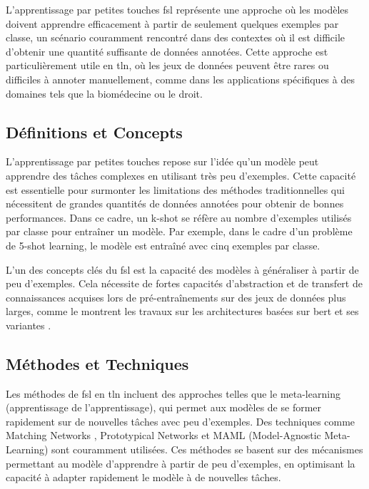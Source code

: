 \documentclass[12pt]{report}
\begin{document}
L'apprentissage par petites touches \gls{fsl} représente une approche où les modèles doivent apprendre efficacement à partir de seulement quelques exemples par classe, un scénario couramment rencontré dans des contextes où il est difficile d'obtenir une quantité suffisante de données annotées. Cette approche est particulièrement utile en \gls{tln}, où les jeux de données peuvent être rares ou difficiles à annoter manuellement, comme dans les applications spécifiques à des domaines tels que la biomédecine ou le droit.

\subsection{Définitions et Concepts}

L'apprentissage par petites touches repose sur l'idée qu'un modèle peut apprendre des tâches complexes en utilisant très peu d'exemples. Cette capacité est essentielle pour surmonter les limitations des méthodes traditionnelles qui nécessitent de grandes quantités de données annotées pour obtenir de bonnes performances. Dans ce cadre, un k-shot se réfère au nombre d'exemples utilisés par classe pour entraîner un modèle. Par exemple, dans le cadre d'un problème de 5-shot learning, le modèle est entraîné avec cinq exemples par classe.

L'un des concepts clés du \gls{fsl} est la capacité des modèles à généraliser à partir de peu d'exemples. Cela nécessite de fortes capacités d'abstraction et de transfert de connaissances acquises lors de pré-entraînements sur des jeux de données plus larges, comme le montrent les travaux sur les architectures basées sur \gls{bert} et ses variantes \cite{devlin2019bert, lee2020biobert, lu2020pubmedbert}.

\subsection{Méthodes et Techniques}

Les méthodes de \gls{fsl} en \gls{tln} incluent des approches telles que le meta-learning (apprentissage de l'apprentissage), qui permet aux modèles de se former rapidement sur de nouvelles tâches avec peu d'exemples. Des techniques comme Matching Networks \cite{vinyals2016matching}, Prototypical Networks \cite{snell2017prototypical} et MAML (Model-Agnostic Meta-Learning) \cite{finn2017model} sont couramment utilisées. Ces méthodes se basent sur des mécanismes permettant au modèle d'apprendre à partir de peu d'exemples, en optimisant la capacité à adapter rapidement le modèle à de nouvelles tâches.
\end{document}
